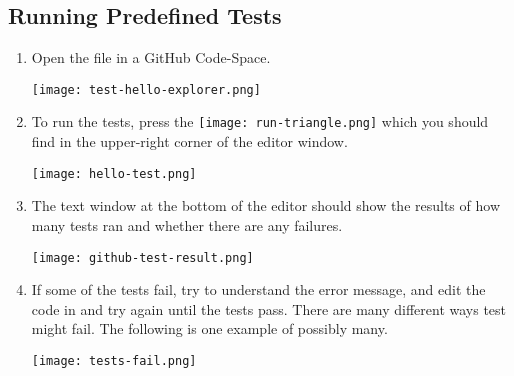 \subsection{Running Predefined Tests}
\label{sec.run.tests}
\begin{enumerate}


\item Open the file  in a GitHub Code-Space.

\noindent\texttt{[image: test-hello-explorer.png]}

\item To run the tests, press the
\texttt{[image: run-triangle.png]} which you should find in
the upper-right corner of the editor window.

\noindent\texttt{[image: hello-test.png]}


\item The text window at the bottom of the editor should show the results of
how many tests ran and whether there are any failures.

\noindent\texttt{[image: github-test-result.png]}

\item If some of the tests fail, try to understand the error message, and edit
  the code in  and try again until the tests pass.  There are many
  different ways test might fail.  The following is one example of possibly many.

\noindent\texttt{[image: tests-fail.png]}


\end{enumerate}

\clearpage

